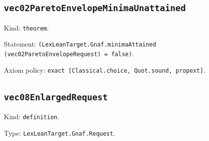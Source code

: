 \documentclass[11pt]{article}
\begin{document}
\subsection*{\texttt{vec02ParetoEnvelopeMinimaUnattained}}
\noindent Kind: \texttt{theorem}.\par
\noindent Statement: \texttt{(LexLeanTarget.Gnaf.minimaAttained (vec02ParetoEnvelopeRequest) = false)}.\par
\noindent Axiom policy: \texttt{exact [Classical.choice, Quot.sound, propext]}.\par
\subsection*{\texttt{vec08EnlargedRequest}}
\noindent Kind: \texttt{definition}.\par
\noindent Type: \texttt{LexLeanTarget.Gnaf.Request}.\par
\end{document}
